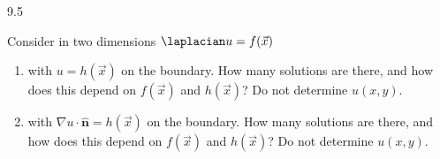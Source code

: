 \begin{exercises}{9.5}
\item Consider in two dimensions $\laplacian u = f(\vec{x})$
\begin{enumerate}
\item[(a)] with $u = h(\vec{x})$ on the boundary.  How many solutions are there, and how does this depend on $f(\vec{x})$ and $h(\vec{x})$?  Do not determine $u(x,y)$.
\item[(b)] with $\nabla u\cdot\hat{\mathbf{n}} = h(\vec{x})$ on the boundary.  How many solutions are there, and how does this depend on $f(\vec{x})$ and $h(\vec{x})$?  Do not determine $u(x,y)$.
\end{enumerate}

\end{exercises}
